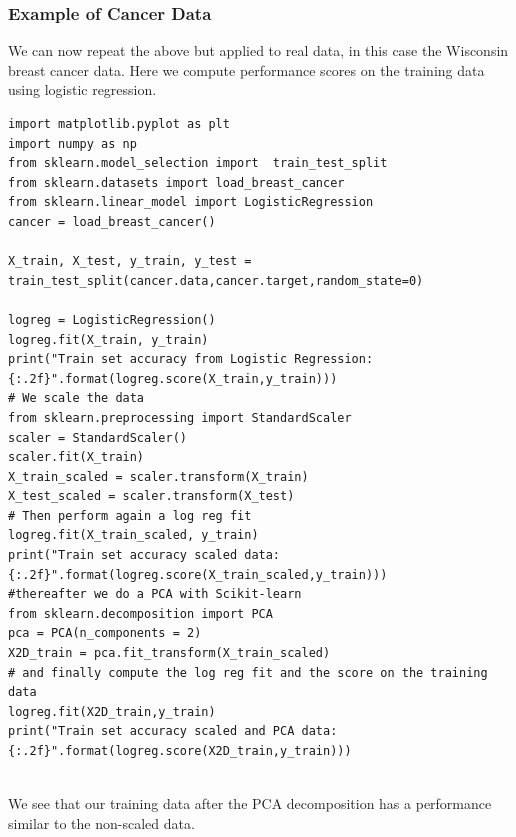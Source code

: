 \documentclass{beamer}
\begin{document}
\begin{frame}
\frametitle{Example of Cancer Data}

We can now repeat the above but applied to real data, in this case the Wisconsin breast cancer data.
Here we compute performance scores on the training data using logistic regression.






























\begin{verbatim}
import matplotlib.pyplot as plt
import numpy as np
from sklearn.model_selection import  train_test_split 
from sklearn.datasets import load_breast_cancer
from sklearn.linear_model import LogisticRegression
cancer = load_breast_cancer()

X_train, X_test, y_train, y_test = train_test_split(cancer.data,cancer.target,random_state=0)

logreg = LogisticRegression()
logreg.fit(X_train, y_train)
print("Train set accuracy from Logistic Regression: {:.2f}".format(logreg.score(X_train,y_train)))
# We scale the data
from sklearn.preprocessing import StandardScaler
scaler = StandardScaler()
scaler.fit(X_train)
X_train_scaled = scaler.transform(X_train)
X_test_scaled = scaler.transform(X_test)
# Then perform again a log reg fit
logreg.fit(X_train_scaled, y_train)
print("Train set accuracy scaled data: {:.2f}".format(logreg.score(X_train_scaled,y_train)))
#thereafter we do a PCA with Scikit-learn
from sklearn.decomposition import PCA
pca = PCA(n_components = 2)
X2D_train = pca.fit_transform(X_train_scaled)
# and finally compute the log reg fit and the score on the training data	
logreg.fit(X2D_train,y_train)
print("Train set accuracy scaled and PCA data: {:.2f}".format(logreg.score(X2D_train,y_train)))


\end{verbatim}


We see that our training data after the PCA decomposition has a performance similar to the non-scaled data. 


\end{frame}
\end{document}
